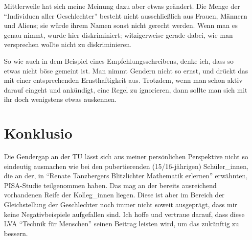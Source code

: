 \documentclass{article}
\begin{document}
Mittlerweile hat sich meine Meinung dazu aber etwas geändert.
Die Menge der \enquote{Individuen aller Geschlechter} besteht nicht ausschließlich aus Frauen, Männern und Aliens;
sie würde ihrem Namen sonst nicht gerecht werden.
Wenn man es genau nimmt, wurde hier diskriminiert;
witzigerweise gerade dabei, wie man versprechen wollte nicht zu diskriminieren.

So wie auch in dem Beispiel eines Empfehlungsschreibens, denke ich, dass so etwas nicht böse gemeint ist.
Man nimmt Gendern nicht so ernst, und drückt das mit einer entsprechenden Ernsthaftigkeit aus.
Trotzdem, wenn man schon aktiv darauf eingeht und ankündigt, eine Regel zu ignorieren, dann sollte man sich mit ihr doch wenigstens etwas auskennen.

\section*{Konklusio}

Die Gendergap an der TU lässt sich aus meiner persönlichen Perspektive nicht so eindeutig ausmachen wie bei den pubertierenden (15/16-jährigen) Schüler\_innen, die an der, in \enquote{Renate Tanzbergers Blitzlichter Mathematik erlernen} erwähnten, PISA-Studie teilgenommen haben.
Das mag an der bereits ausreichend vorhandenen Reife der Kolleg\_innen liegen.
Diese ist aber im Bereich der Gleichstellung der Geschlechter noch immer nicht soweit ausgeprägt, dass mir keine Negativbeispiele aufgefallen sind.
Ich hoffe und vertraue darauf, dass diese LVA \enquote{Technik für Menschen} seinen Beitrag leisten wird, um das zukünftig zu bessern.
\end{document}
